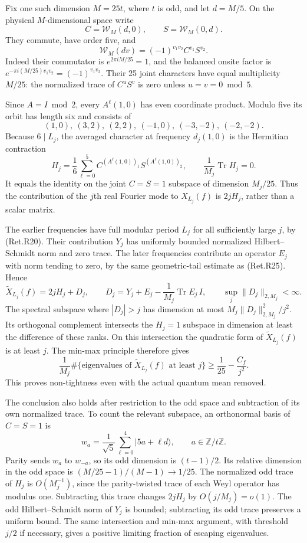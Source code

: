 Fix one such dimension \(M=25t\), where \(t\) is odd, and let \(d=M/5\).
On the physical \(M\)-dimensional space write
\[
 C=\mathcal W_M(d,0),\qquad S=\mathcal W_M(0,d).
\]
They commute, have order five, and
\[
 \mathcal W_M(dv)=(-1)^{v_1v_2}C^{v_1}S^{v_2}.
\]
Indeed their commutator is \(e^{2\pi i M/25}=1\), and the balanced
onsite factor is \(e^{-\pi i(M/25)v_1v_2}=(-1)^{v_1v_2}\).
Their 25 joint characters have equal multiplicity \(M/25\):
the normalized trace of \(C^uS^v\) is zero unless \(u=v=0\bmod5\).

Since \(A=I\bmod2\), every \(A^\ell(1,0)\) has even coordinate product.
Modulo five its orbit has length six and consists of
\[
 (1,0),\ (3,2),\ (2,2),\ (-1,0),\ (-3,-2),\ (-2,-2).
\]
Because \(6\mid L_j\), the averaged character at frequency \(d_j(1,0)\) is
the Hermitian contraction
\[
 H_j=\frac16\sum_{\ell=0}^5
       C^{(A^\ell(1,0))_1}S^{(A^\ell(1,0))_2},\qquad
 \frac1{M_j}\operatorname{Tr}H_j=0.                        \tag{Ret.R28}
\]
It equals the identity on the joint \(C=S=1\) subspace of dimension
\(M_j/25\). Thus the contribution of the \(j\)th real Fourier mode to
\(X_{L_j}(f)\) is \(2jH_j\), rather than a scalar matrix.

The earlier frequencies have full modular period \(L_j\) for all
sufficiently large \(j\), by (Ret.R20). Their contribution \(Y_j\) has
uniformly bounded normalized Hilbert--Schmidt norm and zero trace.
The later frequencies contribute an operator \(E_j\) with norm tending
to zero, by the same geometric-tail estimate as (Ret.R25). Hence
\[
 \widetilde X_{L_j}(f)=2jH_j+D_j,\qquad
 D_j=Y_j+E_j-\frac1{M_j}\operatorname{Tr}E_j\,I,\qquad
 \sup_j\|D_j\|_{2,M_j}<\infty.                             \tag{Ret.R29}
\]
The spectral subspace where \(|D_j|>j\) has dimension at most
\(M_j\|D_j\|_{2,M_j}^2/j^2\). Its orthogonal complement intersects the
\(H_j=1\) subspace in dimension at least the difference of these ranks.
On this intersection the quadratic form of \(\widetilde X_{L_j}(f)\)
is at least \(j\). The min-max principle therefore gives
\[
 \frac1{M_j}\#\{\text{eigenvalues of }\widetilde X_{L_j}(f)
                                           \text{ at least }j\}
       \ge\frac1{25}-\frac{C_f}{j^2}.                     \tag{Ret.R30}
\]
This proves non-tightness even with the actual quantum mean removed.

The conclusion also holds after restriction to the odd space and
subtraction of its own normalized trace. To count the relevant
subspace, an orthonormal basis of \(C=S=1\) is
\[
 w_a=\frac1{\sqrt5}\sum_{\ell=0}^4|5a+\ell d\rangle,
 \qquad a\in\mathbb Z/t\mathbb Z .
\]
Parity sends \(w_a\) to \(w_{-a}\), so its odd dimension is \((t-1)/2\).
Its relative dimension in the odd space is
\((M/25-1)/(M-1)\to1/25\).
The normalized odd trace of \(H_j\) is \(O(M_j^{-1})\), since the
parity-twisted trace of each Weyl operator has modulus one.
Subtracting this trace changes \(2jH_j\) by \(O(j/M_j)=o(1)\).
The odd Hilbert--Schmidt norm of \(Y_j\) is bounded; subtracting its
odd trace preserves a uniform bound.
The same intersection and min-max argument, with threshold \(j/2\) if
necessary, gives a positive limiting fraction of escaping eigenvalues.

